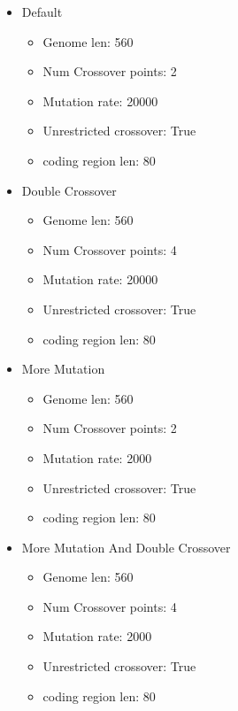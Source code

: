 \documentclass[11pt]{article}
\begin{document}
\begin{itemize}
\item Default
\label{sec:orgheadline22}

\begin{itemize}
\item Genome len: 560
\item Num Crossover points: 2
\item Mutation rate: 20000
\item Unrestricted crossover: True
\item coding region len: 80
\end{itemize}

\item Double Crossover
\label{sec:orgheadline23}

\begin{itemize}
\item Genome len: 560
\item Num Crossover points: 4
\item Mutation rate: 20000
\item Unrestricted crossover: True
\item coding region len: 80
\end{itemize}

\item More Mutation
\label{sec:orgheadline24}

\begin{itemize}
\item Genome len: 560
\item Num Crossover points: 2
\item Mutation rate: 2000
\item Unrestricted crossover: True
\item coding region len: 80
\end{itemize}


\item More Mutation And Double Crossover
\label{sec:orgheadline25}

\begin{itemize}
\item Genome len: 560
\item Num Crossover points: 4
\item Mutation rate: 2000
\item Unrestricted crossover: True
\item coding region len: 80
\end{itemize}


\end{itemize}
\end{document}
